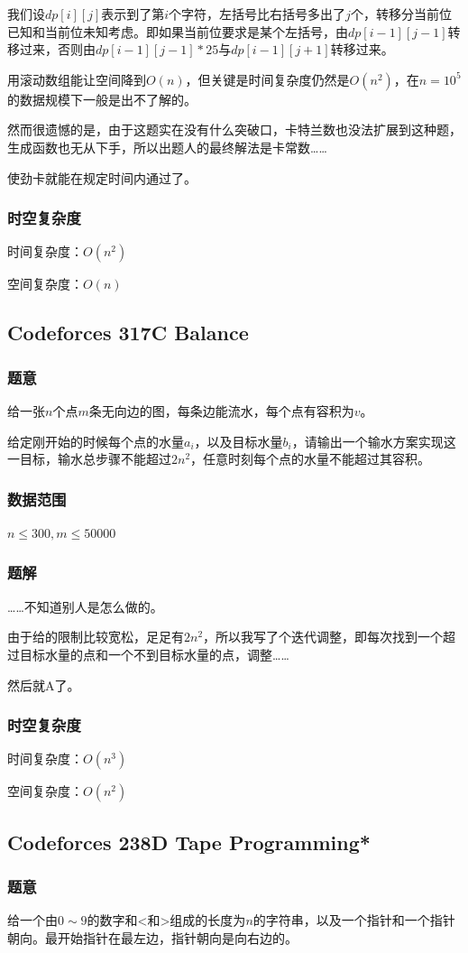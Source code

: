 \documentclass{ctexart}
\begin{document}
我们设$dp[i][j]$表示到了第$i$个字符，左括号比右括号多出了$j$个，转移分当前位已知和当前位未知考虑。即如果当前位要求是某个左括号，由$dp[i-1][j-1]$转移过来，否则由$dp[i-1][j-1]*25$与$dp[i-1][j+1]$转移过来。

用滚动数组能让空间降到$O(n)$，但关键是时间复杂度仍然是$O(n^2)$，在$n=10^5$的数据规模下一般是出不了解的。

然而很遗憾的是，由于这题实在没有什么突破口，卡特兰数也没法扩展到这种题，生成函数也无从下手，所以出题人的最终解法是卡常数……

使劲卡就能在规定时间内通过了。
\subsubsection{时空复杂度}
时间复杂度：$O(n^2)$

空间复杂度：$O(n)$
\subsection{Codeforces 317C Balance}
\subsubsection{题意}
给一张$n$个点$m$条无向边的图，每条边能流水，每个点有容积为$v$。

给定刚开始的时候每个点的水量$a_i$，以及目标水量$b_i$，请输出一个输水方案实现这一目标，输水总步骤不能超过$2n^2$，任意时刻每个点的水量不能超过其容积。
\subsubsection{数据范围}
$n \le 300,m \le 50000$
\subsubsection{题解}
……不知道别人是怎么做的。

由于给的限制比较宽松，足足有$2n^2$，所以我写了个迭代调整，即每次找到一个超过目标水量的点和一个不到目标水量的点，调整……

然后就A了。
\subsubsection{时空复杂度}
时间复杂度：$O(n^3)$

空间复杂度：$O(n^2)$
\subsection{Codeforces 238D Tape Programming*}
\subsubsection{题意}
给一个由$0 \sim 9$的数字和<和>组成的长度为$n$的字符串，以及一个指针和一个指针朝向。最开始指针在最左边，指针朝向是向右边的。
\end{document}
